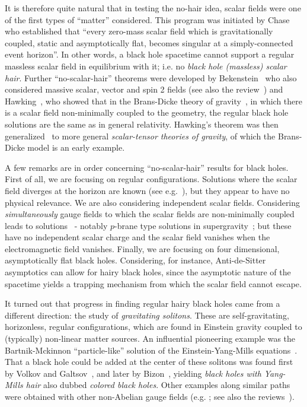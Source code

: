 It is therefore quite natural that in testing the no-hair idea, scalar fields were one of the first types of ``matter'' considered.
This program was initiated by Chase~\cite{Chase:1970wq} who established that ``every zero-mass scalar field which is gravitationally coupled, static and asymptotically flat, becomes singular at a simply-connected event horizon''.
In other words, a black hole spacetime cannot support a regular massless scalar field in equilibrium with it; i.e. no \textit{black hole (massless) scalar hair}.
Further ``no-scalar-hair'' theorems were developed by Bekenstein~\cite{Bekenstein:1971hc,Bekenstein:1972ky} who also considered massive scalar, vector and spin 2 fields (see also the review~\cite{Bekenstein:1996pn}) and Hawking~\cite{Hawking:1972qk}, who showed that in the Brans-Dicke theory of gravity~\cite{Brans:1961sx}, in which there is a scalar field non-minimally coupled to the geometry, the regular black hole solutions are the same as in general relativity.
Hawking's theorem was then generalized~\cite{Sotiriou:2011dz} to more general \textit{scalar-tensor theories of gravity}, of which the Brans-Dicke model is an early example.

A few remarks are in order concerning ``no-scalar-hair'' results for black holes.
First of all, we are focusing on regular configurations.
Solutions where the scalar field diverges at the horizon are known (see e.g.~\cite{BBM}), but they appear to have no physical relevance.
We are also considering independent scalar fields.
Considering \textit{simultaneously} gauge fields to which the scalar fields are non-minimally coupled leads to solutions~\cite{Gibbons:1982ih,Gibbons:1987ps} - notably $p$-brane type solutions in supergravity~\cite{Horowitz:1991cd}; but these have no independent scalar charge and the scalar field vanishes when the electromagnetic field vanishes.
Finally, we are focusing on four dimensional, asymptotically flat black holes.
Considering, for instance, Anti-de-Sitter asymptotics can allow for hairy black holes, since the asymptotic nature of the spacetime yields a trapping mechanism from which the scalar field cannot escape. 

It turned out that progress in finding regular hairy black holes came from a different direction: the study of \textit{gravitating solitons}.
These are self-gravitating, horizonless, regular configurations, which are found in Einstein gravity coupled to (typically) non-linear matter sources.
An influential pioneering example was the Bartnik-Mckinnon ``particle-like'' solution of the Einstein-Yang-Mills equations~\cite{Bartnik:1988am}.
That a black hole could be added at the center of these solitons was found first by Volkov and Galtsov~\cite{Volkov:1989fi}, and later by Bizon~\cite{Bizon:1990sr}, yielding \textit{black holes with Yang-Mills hair} also dubbed \textit{colored black holes}.
Other examples along similar paths were obtained with other non-Abelian gauge fields (e.g. \cite{Droz:1991cx,Lavrelashvili:1992cp}; see also the reviews~\cite{Bizon:1994dh,Volkov:1998cc}).

